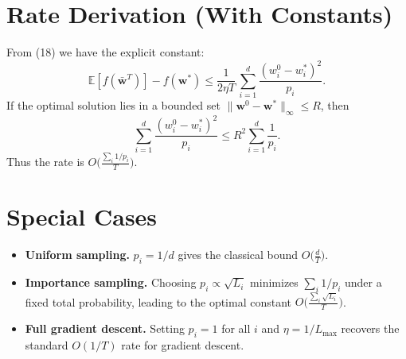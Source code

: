 \documentclass{article}
\newcommand{\E}{\mathbb{E}}
\begin{document}
\section*{Rate Derivation (With Constants)}
From (18) we have the explicit constant:
\[
\E\!\left[f\!\left(\bar{\bm w}^{T}\right)\right]-f(\bm w^{*})
\le
\frac{1}{2\eta T}\,
\sum_{i=1}^{d}\frac{(w^{0}_{i}-w^{*}_{i})^{2}}{p_i}.
\]
If the optimal solution lies in a bounded set $\|\bm w^{0}-\bm w^{*}\|_{\infty}\le R$, then
\[
\sum_{i=1}^{d}\frac{(w^{0}_{i}-w^{*}_{i})^{2}}{p_i}
\le R^{2}\sum_{i=1}^{d}\frac{1}{p_i}.
\]
Thus the rate is $O\!\bigl(\frac{\sum_i 1/p_i}{T}\bigr)$.

\section*{Special Cases}
\begin{itemize}
\item \textbf{Uniform sampling.} $p_i=1/d$ gives the classical bound $O\!\bigl(\frac{d}{T}\bigr)$.
\item \textbf{Importance sampling.} Choosing $p_i\propto \sqrt{L_i}$ minimizes $\sum_i 1/p_i$ under a fixed total probability, leading to the optimal constant $O\!\bigl(\frac{\sum_i\sqrt{L_i}}{T}\bigr)$.
\item \textbf{Full gradient descent.} Setting $p_i=1$ for all $i$ and $\eta=1/L_{\max}$ recovers the standard $O(1/T)$ rate for gradient descent.
\end{itemize}
\end{document}

